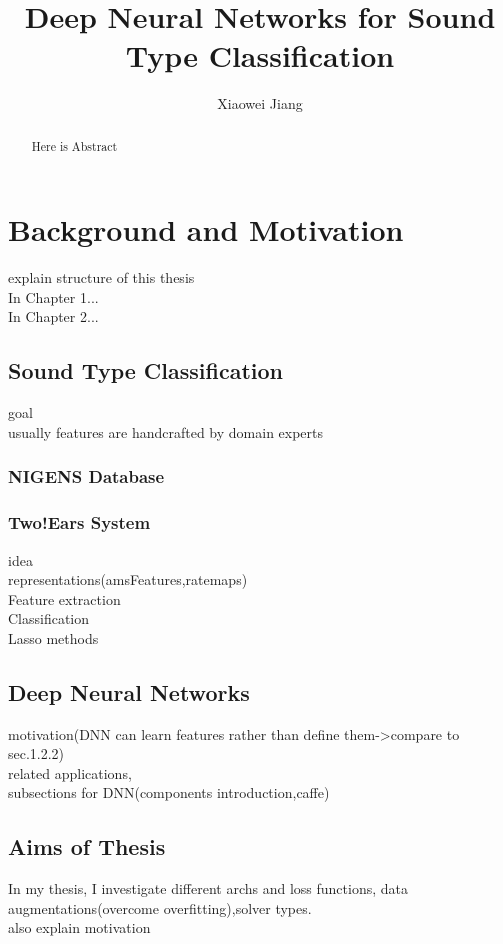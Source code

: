 \documentclass[11pt,a4paper]{article}
\title{Deep Neural Networks for Sound Type Classification}
\author{Xiaowei Jiang}
\begin{document}
\maketitle

\begin{abstract}
	Here is Abstract
\end{abstract}

\tableofcontents


\section{Background and Motivation}
explain structure of this thesis\\
In Chapter 1...\\
In Chapter 2...\\
\subsection{Sound Type Classification}
goal\\
usually features are handcrafted
by domain experts\\
\subsubsection{NIGENS Database}
\subsubsection{Two!Ears System}
idea\\
representations(amsFeatures,ratemaps)\\
{Feature extraction}\\
{Classification}\\
Lasso methods\\
\subsection{Deep Neural Networks}
motivation(DNN can learn features rather than define them->compare to sec.1.2.2)\\
related applications,\\
subsections for DNN(components introduction,caffe)

\subsection{Aims of Thesis}
In my thesis, I investigate different archs and loss functions, data augmentations(overcome overfitting),solver types.\\
also explain motivation\\
\end{document}
